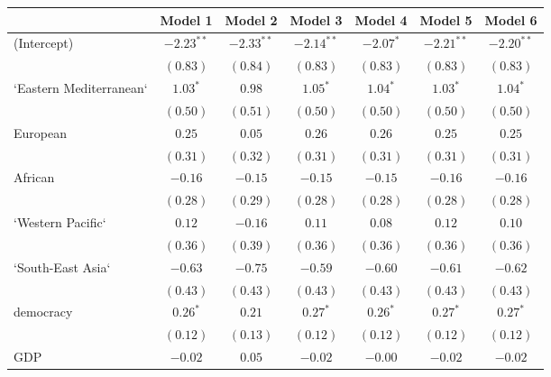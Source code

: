 
\begin{table}[!h]
\begin{center}
\begin{tabular}{l c c c c c c }
\toprule
 & Model 1 & Model 2 & Model 3 & Model 4 & Model 5 & Model 6 \\
\midrule
(Intercept)             & $-2.23^{**}$ & $-2.33^{**}$ & $-2.14^{**}$ & $-2.07^{*}$  & $-2.21^{**}$ & $-2.20^{**}$ \\
                        & $(0.83)$     & $(0.84)$     & $(0.83)$     & $(0.83)$     & $(0.83)$     & $(0.83)$     \\
`Eastern Mediterranean` & $1.03^{*}$   & $0.98$       & $1.05^{*}$   & $1.04^{*}$   & $1.03^{*}$   & $1.04^{*}$   \\
                        & $(0.50)$     & $(0.51)$     & $(0.50)$     & $(0.50)$     & $(0.50)$     & $(0.50)$     \\
European                & $0.25$       & $0.05$       & $0.26$       & $0.26$       & $0.25$       & $0.25$       \\
                        & $(0.31)$     & $(0.32)$     & $(0.31)$     & $(0.31)$     & $(0.31)$     & $(0.31)$     \\
African                 & $-0.16$      & $-0.15$      & $-0.15$      & $-0.15$      & $-0.16$      & $-0.16$      \\
                        & $(0.28)$     & $(0.29)$     & $(0.28)$     & $(0.28)$     & $(0.28)$     & $(0.28)$     \\
`Western Pacific`       & $0.12$       & $-0.16$      & $0.11$       & $0.08$       & $0.12$       & $0.10$       \\
                        & $(0.36)$     & $(0.39)$     & $(0.36)$     & $(0.36)$     & $(0.36)$     & $(0.36)$     \\
`South-East Asia`       & $-0.63$      & $-0.75$      & $-0.59$      & $-0.60$      & $-0.61$      & $-0.62$      \\
                        & $(0.43)$     & $(0.43)$     & $(0.43)$     & $(0.43)$     & $(0.43)$     & $(0.43)$     \\
democracy               & $0.26^{*}$   & $0.21$       & $0.27^{*}$   & $0.26^{*}$   & $0.27^{*}$   & $0.27^{*}$   \\
                        & $(0.12)$     & $(0.13)$     & $(0.12)$     & $(0.12)$     & $(0.12)$     & $(0.12)$     \\
GDP                     & $-0.02$      & $0.05$       & $-0.02$      & $-0.00$      & $-0.02$      & $-0.02$      \\

\end{tabular}
\end{center}
\end{table}
